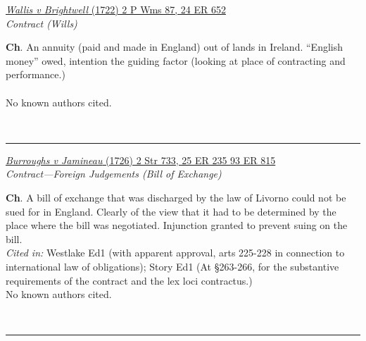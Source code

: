 \documentclass[twoside]{article}
\begin{document}
        \begin{small}
        \begin{center}
        \href{https://heinonline.org/HOL/P?h=hein.engrep/engrc0024&i=660}{\textit{Wallis v Brightwell} (1722) 2 P Wms 87, 24 ER 652} \label{23} \\ 
\textit{Contract (Wills)}\\
        \end{center}
        \textbf{Ch}. An annuity (paid and made in England) out of lands in Ireland. “English money” owed, intention the guiding factor (looking at place of contracting and performance.)\\\\No known authors cited.
        \end{small}\\
        \rule{\textwidth}{0.5pt}
        

        \begin{small}
        \begin{center}
        \href{https://heinonline.org/HOL/P?h=hein.engrep/engrc0025&i=243, https://heinonline.org/HOL/P?h=hein.engrep/engrf0093&i=819}{\textit{Burroughs v Jamineau} (1726) 2 Str 733, 25 ER 235 93 ER 815} \label{10} \\ 
\textit{Contract---Foreign Judgements (Bill of Exchange)}\\
        \end{center}
        \textbf{Ch}. A bill of exchange that was discharged by the law of Livorno could not be sued for in England. Clearly of the view that it had to be determined by the place where the bill was negotiated. Injunction granted to prevent suing on the bill.\\\textit{Cited in: }Westlake Ed1 (with apparent approval, arts 225-228 in connection to international law of obligations); Story Ed1 (At §263-266, for the substantive requirements of the contract and the lex loci contractus.)\\No known authors cited.
        \end{small}\\
        \rule{\textwidth}{0.5pt}
        
\end{document}

